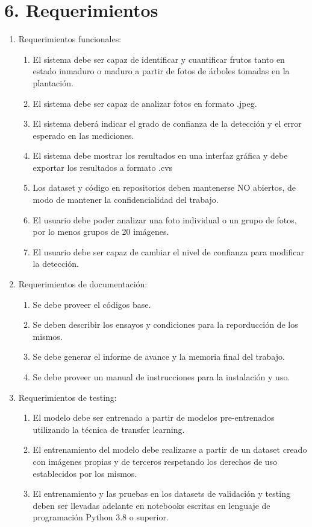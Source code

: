 \documentclass[
11pt %
]{charter}
\begin{document}
\section{6. Requerimientos}
\label{sec:requerimientos}

\begin{enumerate}
	\item Requerimientos funcionales:
	\begin{enumerate}
		\item El sistema debe ser capaz de identificar y cuantificar frutos tanto en estado inmaduro o maduro a partir de fotos de árboles tomadas en la plantación. 
		\item El sistema debe ser capaz de analizar fotos en formato .jpeg.
		\item El sistema deberá indicar el grado de confianza de la detección y el error esperado en las mediciones.
		\item El sistema debe mostrar los resultados en una interfaz gráfica y debe exportar los resultados a formato .cvs 
		\item Los dataset y código en repositorios deben mantenerse NO abiertos, de modo de mantener la confidencialidad del trabajo.
		\item El usuario debe poder analizar una foto individual o un grupo de fotos, por lo menos grupos de 20 imágenes.
		\item El usuario debe ser capaz de cambiar el nivel de confianza para modificar la detección.
	\end{enumerate}

	\item Requerimientos de documentación:
	\begin{enumerate}
		\item Se debe proveer el códigos base.
		\item Se deben describir los ensayos y condiciones para la reporducción de los mismos.
		\item Se debe generar el informe de avance y la memoria final del trabajo.
		\item Se debe proveer un manual de instrucciones para la instalación y uso.
	\end{enumerate}
	
	\item Requerimientos de testing:
	\begin{enumerate}
		\item El modelo debe ser entrenado a partir de modelos pre-entrenados utilizando la técnica de transfer learning.
		\item El entrenamiento del modelo debe realizarse a partir de un dataset creado con imágenes propias y de terceros respetando los derechos de uso establecidos por los mismos.
		\item El entrenamiento y las pruebas en los datasets de validación y testing deben ser llevadas adelante en notebooks escritas en lenguaje de programación Python 3.8 o superior.
	\end{enumerate}
	

\end{enumerate}
\end{document}
